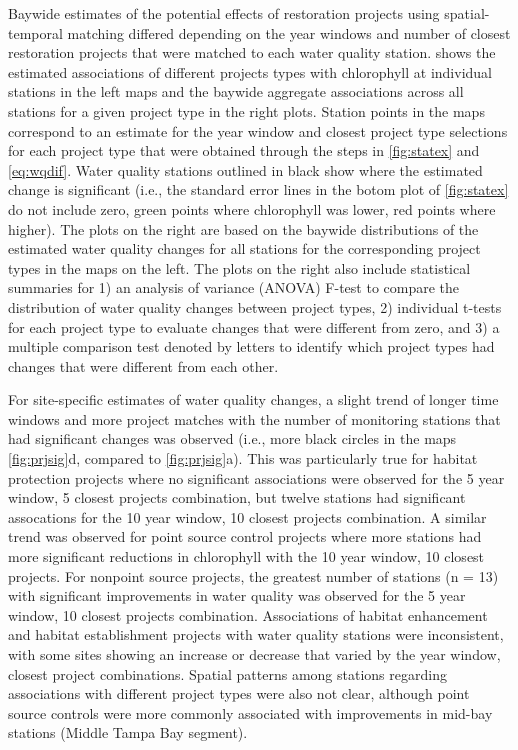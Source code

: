 \documentclass[]{article}
\begin{document}
Baywide estimates of the potential effects of restoration projects using
spatial-temporal matching differed depending on the year windows and
number of closest restoration projects that were matched to each water
quality station.  shows the estimated associations of
different projects types with chlorophyll at individual stations in the
left maps and the baywide aggregate associations across all stations for
a given project type in the right plots. Station points in the maps
correspond to an estimate for the year window and closest project type
selections for each project type that were obtained through the steps in
\cref{fig:statex} and \cref{eq:wqdif}. Water quality stations outlined
in black show where the estimated change is significant (i.e., the
standard error lines in the botom plot of \cref{fig:statex} do not
include zero, green points where chlorophyll was lower, red points where
higher). The plots on the right are based on the baywide distributions
of the estimated water quality changes for all stations for the
corresponding project types in the maps on the left. The plots on the
right also include statistical summaries for 1) an analysis of variance
(ANOVA) F-test to compare the distribution of water quality changes
between project types, 2) individual t-tests for each project type to
evaluate changes that were different from zero, and 3) a multiple
comparison test denoted by letters to identify which project types had
changes that were different from each other.

For site-specific estimates of water quality changes, a slight trend of
longer time windows and more project matches with the number of
monitoring stations that had significant changes was observed (i.e.,
more black circles in the maps \cref{fig:prjsig}d, compared to
\cref{fig:prjsig}a). This was particularly true for habitat protection
projects where no significant associations were observed for the 5 year
window, 5 closest projects combination, but twelve stations had
significant assocations for the 10 year window, 10 closest projects
combination. A similar trend was observed for point source control
projects where more stations had more significant reductions in
chlorophyll with the 10 year window, 10 closest projects. For nonpoint
source projects, the greatest number of stations (n = 13) with
significant improvements in water quality was observed for the 5 year
window, 10 closest projects combination. Associations of habitat
enhancement and habitat establishment projects with water quality
stations were inconsistent, with some sites showing an increase or
decrease that varied by the year window, closest project combinations.
Spatial patterns among stations regarding associations with different
project types were also not clear, although point source controls were
more commonly associated with improvements in mid-bay stations (Middle
Tampa Bay segment).
\end{document}
